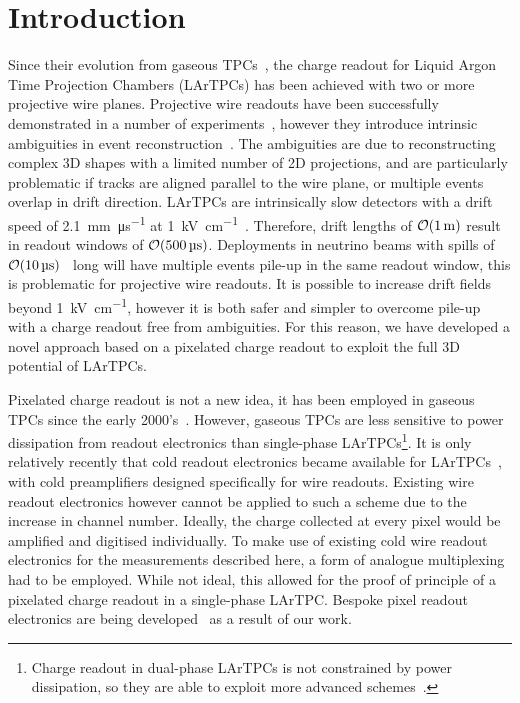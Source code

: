 \documentclass[instruments,article,submit,moreauthors,pdftex]{Definitions/mdpi}
\begin{document}

\section{Introduction} \label{sec:Intro}

Since their evolution from gaseous TPCs~\cite{TPC,LArIonize,LArTPC}, the charge readout for Liquid Argon Time Projection Chambers (LArTPCs) has been achieved with two or more projective wire planes. 
Projective wire readouts have been successfully demonstrated in a number of experiments~\cite{icarus,argonute,uboner}, however they introduce intrinsic ambiguities in event reconstruction~\cite{ambiguous}. 
The ambiguities are due to reconstructing complex 3D shapes with a limited number of 2D projections, and are particularly problematic if tracks are aligned parallel to the wire plane, or multiple events overlap in drift direction.    
LArTPCs are intrinsically slow detectors with a drift speed of \SI{2.1}{\milli\metre\per\micro\second} at \SI{1}{\kilo\volt\per\centi\metre}~\cite{protoLASER}.
Therefore, drift lengths of $\order{\SI{1}{\metre}}$ result in readout windows of $\order{\SI{500}{\micro\second}}$. 
Deployments in neutrino beams with spills of $\order{\SI{10}{\micro\second}}$~\cite{numi, DUNE3} long will have multiple events pile-up in the same readout window, this is problematic for projective wire readouts.
It is possible to increase drift fields beyond \SI{1}{\kilo\volt\per\centi\metre}\cite{breakdown_16, latex}, however it is both safer and simpler to overcome pile-up with a charge readout free from ambiguities. 
For this reason, we have developed a novel approach based on a pixelated charge readout to exploit the full 3D potential of LArTPCs.

Pixelated charge readout is not a new idea, it has been employed in gaseous TPCs since the early 2000's~\cite{gaspix}. 
However, gaseous TPCs are less sensitive to power dissipation from readout electronics than single-phase LArTPCs\footnote{Charge readout in dual-phase LArTPCs is not constrained by power dissipation, so they are able to exploit more advanced schemes~\cite{Far_Detectors}.}. 
It is only relatively recently that cold readout electronics became available for LArTPCs~\cite{larasic}, with cold preamplifiers designed specifically for wire readouts.  
Existing wire readout electronics however cannot be applied to such a scheme due to the increase in channel number.  
Ideally, the charge collected at every pixel would be amplified and digitised individually.
To make use of existing cold wire readout electronics for the measurements described here, a form of analogue multiplexing had to be employed. 
While not ideal, this allowed for the proof of principle of a pixelated charge readout in a single-phase LArTPC.   
Bespoke pixel readout electronics are being developed~\cite{larpix} as a result of our work.
\end{document}
